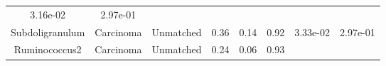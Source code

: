 \documentclass[12pt,]{article}
\begin{document}
\begin{longtable}[]{@{}cccccccc@{}}
\begin{minipage}[t]{0.06\columnwidth}
3.16e-02\strut
\end{minipage} & \begin{minipage}[t]{0.06\columnwidth}\centering\strut
2.97e-01\strut
\end{minipage}\tabularnewline
\begin{minipage}[t]{0.19\columnwidth}\centering\strut
Subdoligranulum\strut
\end{minipage} & \begin{minipage}[t]{0.07\columnwidth}\centering\strut
Carcinoma\strut
\end{minipage} & \begin{minipage}[t]{0.09\columnwidth}\centering\strut
Unmatched\strut
\end{minipage} & \begin{minipage}[t]{0.03\columnwidth}\centering\strut
0.36\strut
\end{minipage} & \begin{minipage}[t]{0.14\columnwidth}\centering\strut
0.14\strut
\end{minipage} & \begin{minipage}[t]{0.14\columnwidth}\centering\strut
0.92\strut
\end{minipage} & \begin{minipage}[t]{0.06\columnwidth}\centering\strut
3.33e-02\strut
\end{minipage} & \begin{minipage}[t]{0.06\columnwidth}\centering\strut
2.97e-01\strut
\end{minipage}\tabularnewline
\begin{minipage}[t]{0.19\columnwidth}\centering\strut
Ruminococcus2\strut
\end{minipage} & \begin{minipage}[t]{0.07\columnwidth}\centering\strut
Carcinoma\strut
\end{minipage} & \begin{minipage}[t]{0.09\columnwidth}\centering\strut
Unmatched\strut
\end{minipage} & \begin{minipage}[t]{0.03\columnwidth}\centering\strut
0.24\strut
\end{minipage} & \begin{minipage}[t]{0.14\columnwidth}\centering\strut
0.06\strut
\end{minipage} & \begin{minipage}[t]{0.14\columnwidth}\centering\strut
0.93\strut
\end{minipage} & \begin{minipage}[t]{0.06\columnwidth}\centering\strut

\end{minipage}
\end{longtable}
\end{document}
